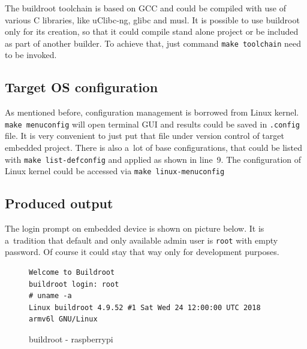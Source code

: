 \documentclass[printmode]{mgr}
\begin{document}
The buildroot toolchain is based on GCC and could be compiled with use of various C libraries, like uClibc-ng, glibc and musl. It is possible to use buildroot only for its creation, so that it could compile stand alone project or be included as part of another builder. To achieve that, just command \verb|make toolchain| need to be invoked.

\subsection*{Target OS configuration}

As mentioned before, configuration management is borrowed from Linux kernel.
\verb|make menuconfig| will open terminal GUI and results could be saved in \verb|.config| file.
It is very convenient to just put that file under version control of target embedded project.
There is also a~lot of base configurations, that could be listed with \verb|make list-defconfig| and applied as shown in line~9.
The configuration of Linux kernel could be accessed via \verb|make linux-menuconfig|

\subsection*{Produced output}
The login prompt on embedded device is shown on picture below.
It is a~tradition that default and only available admin user is \verb|root| with empty password.
Of course it could stay that way only for development purposes.

\begin{figure}
    \centering
\begin{verbatim}
Welcome to Buildroot
buildroot login: root
# uname -a
Linux buildroot 4.9.52 #1 Sat Wed 24 12:00:00 UTC 2018 armv6l GNU/Linux
\end{verbatim}
    \caption{buildroot - raspberrypi}
\end{figure}












\end{document}
